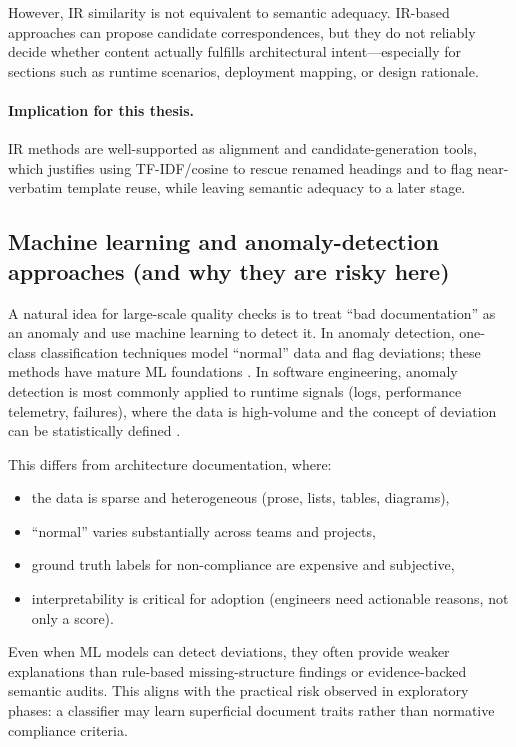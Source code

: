 However, IR similarity is not equivalent to semantic adequacy. IR-based approaches can propose candidate correspondences, but they do not reliably decide whether content actually fulfills architectural intent—especially for sections such as runtime scenarios, deployment mapping, or design rationale.

\paragraph{Implication for this thesis.}
IR methods are well-supported as alignment and candidate-generation tools, which justifies using TF-IDF/cosine to rescue renamed headings and to flag near-verbatim template reuse, while leaving semantic adequacy to a later stage.

\subsection{Machine learning and anomaly-detection approaches (and why they are risky here)}
A natural idea for large-scale quality checks is to treat ``bad documentation'' as an anomaly and use machine learning to detect it. In anomaly detection, one-class classification techniques model ``normal'' data and flag deviations; these methods have mature ML foundations \cite{one_class_svm}. In software engineering, anomaly detection is most commonly applied to runtime signals (logs, performance telemetry, failures), where the data is high-volume and the concept of deviation can be statistically defined \cite{se_anomaly_detection_survey}.

This differs from architecture documentation, where:
\begin{itemize}
    \item the data is sparse and heterogeneous (prose, lists, tables, diagrams),
    \item ``normal'' varies substantially across teams and projects,
    \item ground truth labels for non-compliance are expensive and subjective,
    \item interpretability is critical for adoption (engineers need actionable reasons, not only a score).
\end{itemize}

Even when ML models can detect deviations, they often provide weaker explanations than rule-based missing-structure findings or evidence-backed semantic audits. This aligns with the practical risk observed in exploratory phases: a classifier may learn superficial document traits rather than normative compliance criteria.


